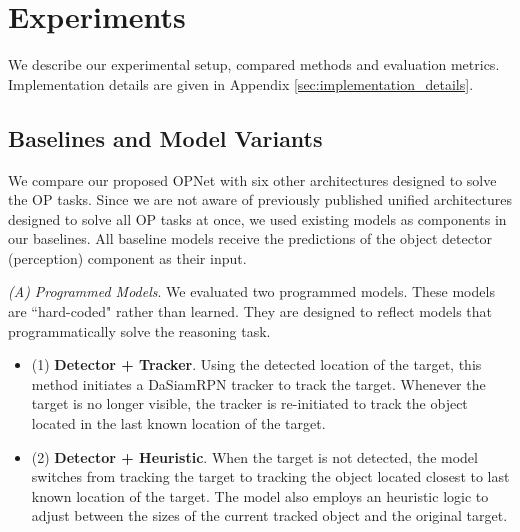 \documentclass[]{llncs}
\begin{document}
\section{Experiments}
\label{Experiments}
We describe our experimental setup, compared methods and evaluation metrics. Implementation details are given in Appendix \ref{sec:implementation_details}.


\subsection{Baselines and Model Variants} \label{baseline_models}
We compare our proposed OPNet with six other architectures designed to solve the OP tasks. Since we are not aware of previously published unified architectures designed to solve all OP tasks at once, we used existing models as components in our baselines. All baseline models receive the predictions of the object detector (perception) component as their input.

\vspace{5pt}
\noindent\textit{(A) Programmed Models}. We evaluated two programmed models. These models are ``hard-coded" rather than learned. They are designed to reflect models that programmatically solve the reasoning task.
\begin{itemize}
    \item (1) \textbf{Detector + Tracker}. Using the detected location of the target, this method initiates a DaSiamRPN tracker \cite{Zhu_2018_ECCV} to track the target. Whenever the target is no longer visible, the tracker is re-initiated to track the object located in the last known location of the target.
    \item (2) \textbf{Detector + Heuristic}. When the target is not detected, the model switches from tracking the target to tracking the object located closest to last known location of the target. The model also employs an heuristic logic to adjust between the sizes of the current tracked object and the original target.
\end{itemize}
\end{document}
